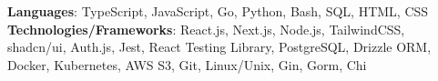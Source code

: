 \textbf{Languages}: TypeScript, JavaScript, Go, Python, Bash, SQL, HTML, CSS \\
\textbf{Technologies/Frameworks}: React.js, Next.js, Node.js, TailwindCSS, shadcn/ui, Auth.js, Jest, React Testing Library, PostgreSQL, Drizzle ORM, Docker, Kubernetes, AWS S3, Git, Linux/Unix, Gin, Gorm, Chi